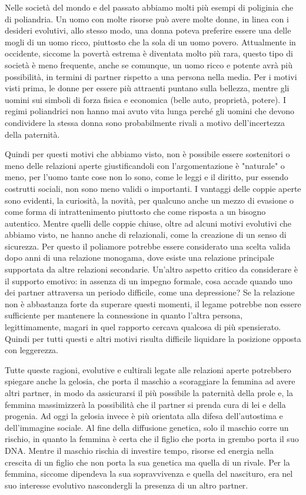 \documentclass[12pt]{book} %
\begin{document}
Nelle società del mondo e del passato abbiamo molti più esempi di poliginia che di poliandria. Un uomo con molte risorse
può avere molte donne, in linea con i desideri evolutivi, allo stesso modo, una donna poteva preferire essere una delle
mogli di un uomo ricco, piuttosto che la sola di un uomo povero. Attualmente in occidente, siccome la povertà estrema è
diventata molto più rara, questo tipo di società è meno frequente, anche se comunque, un uomo ricco e potente avrà più
possibilità, in termini di partner rispetto a una persona nella media. Per i motivi visti prima, le donne per essere
più attraenti puntano sulla bellezza, mentre gli uomini sui simboli di forza fisica e economica (belle auto, proprietà,
potere). I regimi poliandrici non hanno mai avuto vita lunga perché gli uomini che devono condividere la stessa donna
sono probabilmente rivali a motivo dell'incertezza della paternità.

Quindi per questi motivi che abbiamo visto, non è possibile essere sostenitori o meno delle relazioni aperte giustificandoli con l'argomentazione è "naturale" o meno, per l'uomo tante cose non lo sono, come le leggi e il diritto, pur essendo costrutti sociali, non sono meno validi o importanti. I vantaggi delle coppie aperte sono evidenti, la curiosità, la novità, per qualcuno anche un mezzo di evasione o come forma di intrattenimento piuttosto che come risposta a un bisogno autentico. Mentre quelli delle coppie chiuse, oltre ad alcuni motivi evolutivi che abbiamo visto, ne hanno anche di relazionali, come la creazione di un senso di sicurezza. Per questo il poliamore potrebbe essere considerato una scelta valida dopo anni di una relazione monogama, dove esiste una relazione principale supportata da altre relazioni secondarie.
Un'altro aspetto critico da considerare è il supporto emotivo: in assenza di un impegno formale, cosa accade quando uno dei partner attraversa un periodo difficile, come una depressione? Se la relazione non è abbastanza forte da superare questi momenti, il legame potrebbe non essere sufficiente per mantenere la connessione in quanto l'altra persona, legittimamente, magari in quel rapporto cercava qualcosa di più spensierato. Quindi per tutti questi e altri motivi risulta difficile liquidare la posizione opposta con leggerezza.

Tutte queste ragioni, evolutive e cultirali legate alle relazioni aperte potrebbero spiegare anche la gelosia, che porta il maschio a scoraggiare la femmina ad avere altri
partner, in modo da assicurarsi il più possibile la paternità della prole e, la femmina massimizzerà la possibilità che
il partner si prenda cura di lei e della progenia. Ad oggi la gelosia invece è più orientata alla difesa
dell'autostima e dell'immagine sociale. Al fine della diffusione genetica,
solo il maschio corre un rischio, in quanto la femmina è certa che il figlio che porta in grembo porta il suo DNA.
Mentre il maschio rischia di investire tempo, risorse ed energia nella crescita di un figlio che non porta la sua
genetica ma quella di un rivale. Per la femmina, siccome dipendeva la sua sopravvivenza e quella del nascituro, era nel
suo interesse evolutivo nascondergli la presenza di un altro partner.
\end{document}
